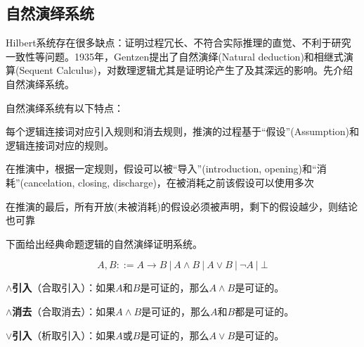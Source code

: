 \subsection{自然演绎系统}

Hilbert系统存在很多缺点：证明过程冗长、不符合实际推理的直觉、不利于研究一致性等问题。1935年，Gentzen提出了自然演绎(Natural deduction)和相继式演算(Sequent Calculus)，对数理逻辑尤其是证明论产生了及其深远的影响。先介绍自然演绎系统。


自然演绎系统有以下特点：

\begin{tightenum}
\item 每个逻辑连接词对应引入规则和消去规则，推演的过程基于``假设''(Assumption)和逻辑连接词对应的规则。
\item 在推演中，根据一定规则，假设可以被``导入''(introduction, opening)和``消耗''(cancelation, closing, discharge)，在被消耗之前该假设可以使用多次
\item 在推演的最后，所有开放(未被消耗)的假设必须被声明，剩下的假设越少，则结论也可靠
\end{tightenum}


下面给出经典命题逻辑的自然演绎证明系统。

$$A, B ::= A \to B \ | \ A \land B \ | \ A \lor B \ | \ \neg A \ | \ \bot$$

\textbf{$\land$引入}（合取引入）：如果$A$和$B$是可证的，那么$A \land B$是可证的。

\begin{prooftree}
\end{prooftree}


\textbf{$\land$消去}（合取消去）：如果$A \land B$是可证的，那么$A$和$B$都是可证的。

\begin{prooftree}
\end{prooftree}

\begin{prooftree}
\end{prooftree}



\textbf{$\lor$引入}（析取引入）：如果$A$或$B$是可证的，那么$A \lor B$是可证的。

\begin{prooftree}
\end{prooftree}

